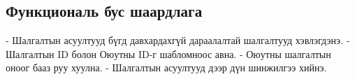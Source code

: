 \subsection{Функциональ бус шаардлага}
\begin{flushleft}
- Шалгалтын асуултууд бүгд давхардахгүй дараалалтай шалгалтууд хэвлэгдэнэ.\linebreak
- Шалгалтын ID болон Оюутны ID-г шабломноос авна.\linebreak
- Оюутны шалгалтын оноог бааз руу хуулна.\linebreak
- Шалгалтын асуултууд дээр дүн шинжилгээ хийнэ.\linebreak
\end{flushleft}
